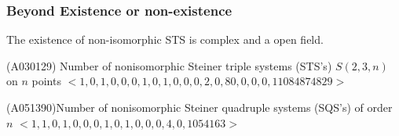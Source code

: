 \begin{frame}
\frametitle{Beyond Existence or non-existence}


\pause[1]
\begin{block}{}
The existence of non-isomorphic STS is complex and a open field.
\end{block}


\pause[2]
\begin{block}{(A030129) Number of nonisomorphic Steiner triple systems (STS's) $S(2,3,n)$ on $n$ points}
	$<1, 0, 1, 0, 0, 0, 1, 0, 1, 0, 0, 0, 2, 0, 80, 0, 0, 0, 11084874829>$%
\end{block}
\begin{block}{(A051390)Number of nonisomorphic Steiner quadruple systems (SQS's) of order $n$ }
	$<1, 1, 0, 1, 0, 0, 0, 1, 0, 1, 0, 0, 0, 4, 0, 1054163>$%
\end{block}
\end{frame}